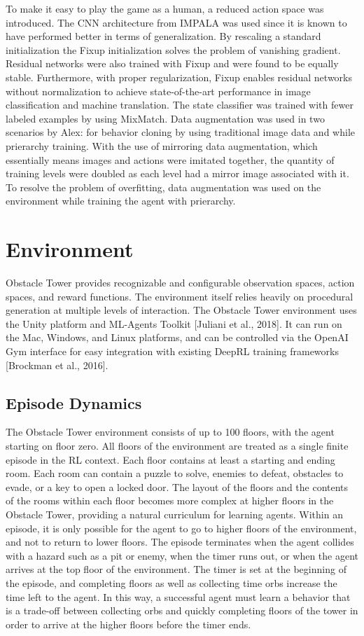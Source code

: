 \documentclass[conference]{IEEEtran}
\begin{document}
To make it easy to play the game as a human, a reduced action space was introduced.  The CNN architecture from IMPALA was used since it is known to have performed better in terms of generalization. By rescaling a standard initialization the Fixup initialization solves the problem of vanishing gradient. Residual networks were also trained with Fixup and were found to be equally stable. Furthermore, with proper regularization, Fixup enables residual networks without normalization to achieve state-of-the-art performance in image classification and machine translation. The state classifier was trained with fewer labeled examples by using MixMatch.
Data augmentation was used in two scenarios by Alex: for behavior cloning by using traditional image data and while prierarchy training. With the use of mirroring data augmentation, which essentially means images and actions were imitated together, the quantity of training levels were doubled as each level had a mirror image associated with it. To resolve the problem of overfitting, data augmentation was used on the environment while training the agent with prierarchy. 


\section{Environment}
Obstacle Tower provides recognizable and configurable observation spaces, action spaces, and reward functions. The environment itself relies heavily on procedural generation at multiple levels of interaction. The Obstacle Tower environment uses the Unity platform and ML-Agents Toolkit [Juliani et al., 2018]. It can run on the Mac, Windows, and Linux platforms, and can be controlled via the OpenAI Gym interface for easy integration with existing DeepRL training frameworks [Brockman et al., 2016].

\subsection{\textbf{Episode Dynamics}}
The Obstacle Tower environment consists of up to 100 floors, with the agent starting on floor zero. All floors of the environment are treated as a single finite episode in the RL context. Each floor contains at least a starting and ending room. Each room can contain a puzzle to solve, enemies to defeat, obstacles to evade, or a key to open a locked door. The layout of the floors and the contents of the rooms within each floor becomes more complex at higher floors in the Obstacle Tower, providing a natural curriculum for learning agents. Within an episode, it is only possible for the agent to go to higher floors of the environment, and not to return to lower floors.
The episode terminates when the agent collides with a hazard such as a pit or enemy, when the timer runs out, or when the agent arrives at the top floor of the environment. The timer is set at the beginning of the episode, and completing floors as well as collecting time orbs increase the time left to
the agent. In this way, a successful agent must learn a behavior that is a trade-off between collecting orbs and quickly completing floors of the tower in order to arrive at the higher floors before the timer ends.
\end{document}
